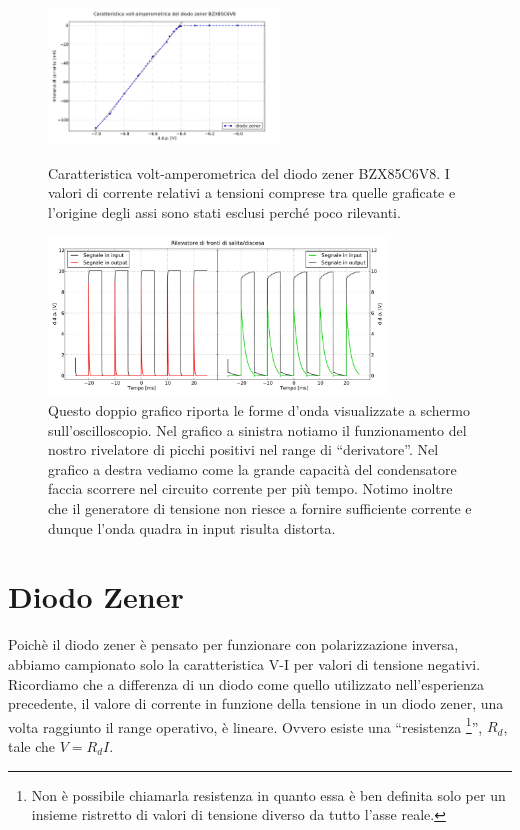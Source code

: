 \begin{figure}
\centering
	\caption{Caratteristica volt-amperometrica del diodo zener BZX85C6V8. I valori di corrente relativi a tensioni comprese tra quelle graficate e l'origine degli assi sono stati esclusi perché poco rilevanti.}
	\includegraphics[width=0.55\textwidth]{VI_zener.pdf}
	\label{fig:VI_zener}
\end{figure}

\begin{figure}[H]
\center
	\includegraphics[width=0.80\textwidth]{peaks(2).pdf}
	\caption{Questo doppio grafico riporta le forme d'onda visualizzate a schermo sull'oscilloscopio. Nel grafico a sinistra notiamo il funzionamento del nostro rivelatore di picchi positivi nel range di ``derivatore''. Nel grafico a destra vediamo come la grande capacità del condensatore faccia scorrere nel circuito corrente per più tempo. Notimo inoltre che il generatore di tensione non riesce a fornire sufficiente corrente e dunque l'onda quadra in input risulta distorta.}
	\label{fig:peaks}
\end{figure}

\section{Diodo Zener}

Poichè il diodo zener è pensato per funzionare con polarizzazione inversa, abbiamo campionato solo la caratteristica V-I per valori di tensione negativi. Ricordiamo che a differenza di un diodo come quello utilizzato nell'esperienza precedente, il valore di corrente in funzione della tensione in un diodo zener, una volta raggiunto il range operativo, è lineare. Ovvero esiste una ``resistenza \footnote{Non è possibile chiamarla resistenza in quanto essa è ben definita solo per un insieme ristretto di valori di tensione diverso da tutto l'asse reale.}'', $R_d$, tale che $V=R_d I$.

